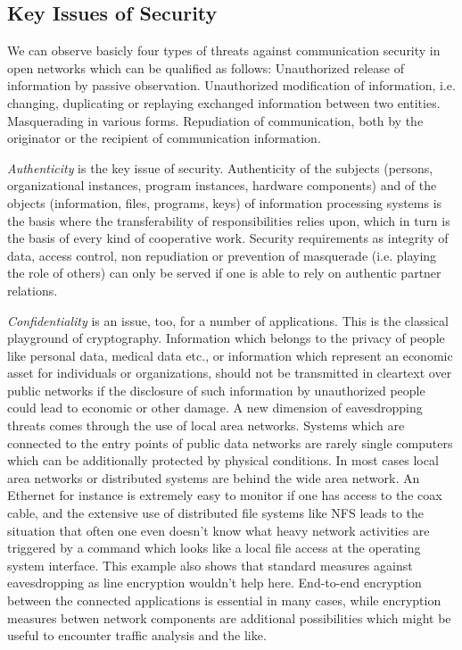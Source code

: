 \subsection{Key Issues of Security}
We can observe basicly four types of threats against communication security
in open networks which can be qualified as follows:
\bi
\m Unauthorized release of information by passive observation.
\m Unauthorized modification of information, i.e. changing, duplicating
   or replaying exchanged information between two entities.
\m Masquerading in various forms.
\m Repudiation of communication, both by the originator or the
   recipient of communication information.
\ei

{\em Authenticity} is the key issue of security. Authenticity of the subjects (persons,
organizational instances, program instances, hardware components) 
and of the objects (information, files, programs,
keys) of information processing systems is the basis where the transferability
of responsibilities relies upon, which in turn is the basis of every kind
of cooperative work. Security requirements as integrity of data, access control,
non repudiation or prevention of masquerade (i.e. playing the role of others)
can only be served if one is able to rely on authentic partner relations.

{\em Confidentiality} is an issue, too, for a number of applications.
This is the classical playground of cryptography. Information which belongs
to the privacy of people like personal data, medical data etc., 
or information which represent an economic asset for individuals or organizations,
should not be transmitted in cleartext over public
networks if the disclosure of such information by unauthorized people
could lead to economic or other damage. 
A new dimension of eavesdropping threats comes through the use
of local area networks. Systems which are connected to the entry points
of public data networks are rarely single computers which can be additionally
protected by physical conditions. In most cases
local area networks or distributed systems are behind the wide area network.
An Ethernet for instance is extremely easy to monitor if one has access to
the coax cable, and the extensive use of distributed file systems like NFS
leads to the situation that often one even doesn't know what heavy
network activities are triggered by a command which looks like a local
file access at the operating system interface. This example also shows
that standard measures against eavesdropping as line encryption
wouldn't help here. End-to-end encryption between the connected applications 
is essential in many cases, while encryption measures betwen network
components are additional possibilities which might be useful to
encounter traffic analysis and the like.


